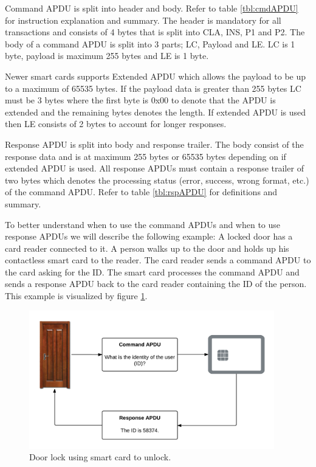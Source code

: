 Command APDU is split into header and body. Refer to table \ref{tbl:cmdAPDU} for instruction explanation and summary. The header is mandatory for all transactions and consists of 4 bytes that is split into CLA, INS, P1 and P2. The body of a command APDU is split into 3 parts; LC, Payload and LE. LC is 1 byte, payload is maximum 255 bytes and LE is 1 byte.

Newer smart cards supports Extended APDU which allows the payload to be up to a maximum of 65535 bytes. If the payload data is greater than 255 bytes LC must be 3 bytes where the first byte is 0x00 to denote that the APDU is extended and the remaining bytes denotes the length. If extended APDU is used then LE consists of 2 bytes to account for longer responses.


Response APDU is split into body and response trailer. The body consist of the response data and is at maximum 255 bytes or 65535 bytes depending on if extended APDU is used. All response APDUs must contain a response trailer of two bytes which denotes the processing status (error, success, wrong format, etc.) of the command APDU. Refer to table \ref{tbl:rspAPDU} for definitions and summary.


To better understand when to use the command APDUs and when to use response APDUs we will describe the following example: A locked door has a card reader connected to it. A person walks up to the door and holds up his contactless smart card to the reader. The card reader sends a command APDU to the card asking for the ID. The smart card processes the command APDU and sends a response APDU back to the card reader containing the ID of the person. This example is visualized by figure \ref{fig:doornfc}.

\begin{figure}[h!]
  \caption{Door lock using smart card to unlock.}
  \label{fig:doornfc}
  \centering
    \includegraphics[width=0.95\textwidth]{images/doornfc.png}
\end{figure}

